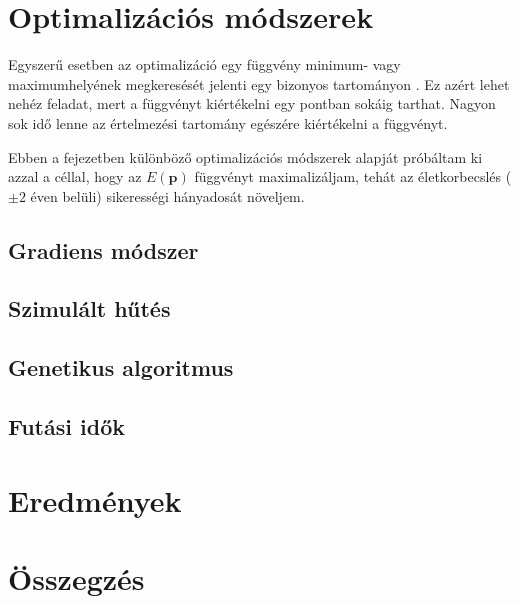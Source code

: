\documentclass[12pt]{article}
\begin{document}
\section{Optimalizációs módszerek}
Egyszerű esetben az optimalizáció egy függvény minimum- vagy maximumhelyének megkeresését jelenti egy bizonyos tartományon \cite{Holder}. \iffalse TODO: példa a prog opt.-ról? \fi Ez azért lehet nehéz feladat, mert a függvényt kiértékelni egy pontban sokáig tarthat. Nagyon sok idő lenne az értelmezési tartomány egészére kiértékelni a függvényt.

Ebben a fejezetben különböző optimalizációs módszerek alapját próbáltam ki azzal a céllal, hogy az $E(\mathbf{p})$ függvényt maximalizáljam, tehát az életkorbecslés ($\pm 2$ éven belüli) sikerességi hányadosát növeljem.
\subsection{Gradiens módszer}
\subsection{Szimulált hűtés}
\subsection{Genetikus algoritmus}
\subsection{Futási idők}
\section{Eredmények}
\section{Összegzés}


\end{document}
